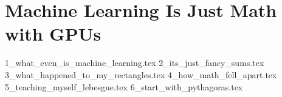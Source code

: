 \section{Machine Learning Is Just Math with GPUs}

{1_what_even_is_machine_learning.tex}
{2_its_just_fancy_sums.tex}
{3_what_happened_to_my_rectangles.tex}
{4_how_math_fell_apart.tex}
{5_teaching_myself_lebesgue.tex}
{6_start_with_pythagoras.tex}




























